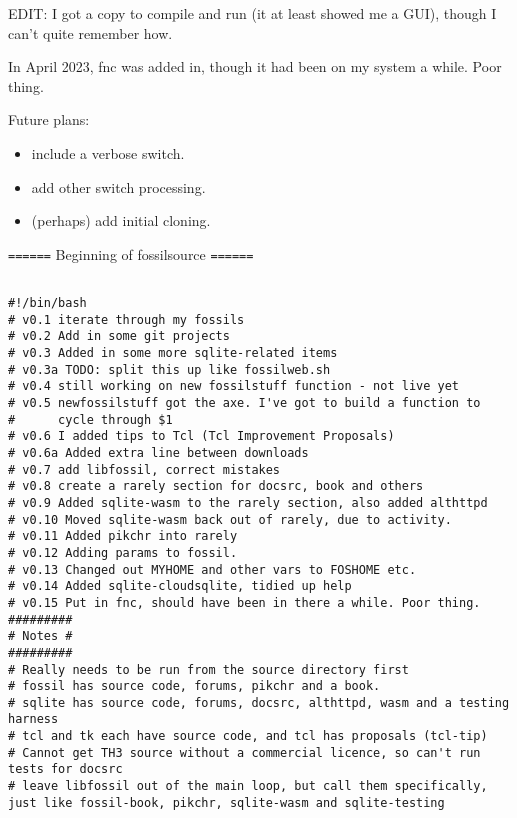 \documentclass[11pt]{article}
\begin{document}
EDIT: I got a copy to compile and run (it at least showed me a GUI), though I can't quite remember
how.

In April 2023, fnc was added in, though it had been on my system a while. Poor thing.

Future plans: 
\begin{itemize}
\item include a verbose switch.
\item add other switch processing.
\item (perhaps) add initial cloning.
\end{itemize}

\texttt{======} Beginning of fossilsource \texttt{======}

\begin{verbatim}

#!/bin/bash
# v0.1 iterate through my fossils
# v0.2 Add in some git projects
# v0.3 Added in some more sqlite-related items
# v0.3a TODO: split this up like fossilweb.sh
# v0.4 still working on new fossilstuff function - not live yet
# v0.5 newfossilstuff got the axe. I've got to build a function to
#      cycle through $1
# v0.6 I added tips to Tcl (Tcl Improvement Proposals)
# v0.6a Added extra line between downloads
# v0.7 add libfossil, correct mistakes
# v0.8 create a rarely section for docsrc, book and others
# v0.9 Added sqlite-wasm to the rarely section, also added althttpd
# v0.10 Moved sqlite-wasm back out of rarely, due to activity.
# v0.11 Added pikchr into rarely
# v0.12 Adding params to fossil.
# v0.13 Changed out MYHOME and other vars to FOSHOME etc.
# v0.14 Added sqlite-cloudsqlite, tidied up help
# v0.15 Put in fnc, should have been in there a while. Poor thing.
#########
# Notes #
#########
# Really needs to be run from the source directory first
# fossil has source code, forums, pikchr and a book.
# sqlite has source code, forums, docsrc, althttpd, wasm and a testing harness
# tcl and tk each have source code, and tcl has proposals (tcl-tip)
# Cannot get TH3 source without a commercial licence, so can't run tests for docsrc
# leave libfossil out of the main loop, but call them specifically, just like fossil-book, pikchr, sqlite-wasm and sqlite-testing


\end{verbatim}
\end{document}
